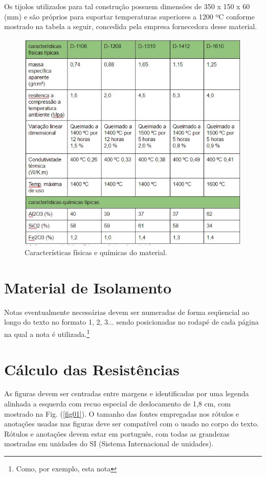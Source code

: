 Os tijolos utilizados para tal construção possuem dimensões de 350 x 150 x 60 (mm) e são próprios para suportar temperaturas superiores a 1200 ºC conforme mostrado na tabela a seguir, concedida pela empresa fornecedora desse material.

\begin{figure}[h]
	\centering
	\label{tebela_dimensoes}
	\includegraphics[keepaspectratio=true,scale=1.0]{figuras/tabela_dimensoes.JPG}
	\caption{Características físicas e químicas do material.}
\end{figure}

\section{Material de Isolamento}

Notas eventualmente necessárias devem ser numeradas de forma seqüencial ao 
longo do texto no formato 1, 2, 3... sendo posicionadas no rodapé de cada 
página na qual a nota é utilizada.\footnote{Como, por exemplo, esta nota}


\section{Cálculo das Resistências}

As figuras devem ser centradas entre margens e identificadas por uma legenda 
alinhada a esquerda com recuo especial de deslocamento de 1,8 cm, com mostrado 
na Fig. (\ref{fig01}). O tamanho das fontes empregadas nos rótulos e anotações 
usadas nas figuras deve ser compatível com o usado no corpo do texto. Rótulos e 
anotações devem estar em português, com todas as grandezas mostradas em 
unidades do SI (Sistema Internacional de unidades).

